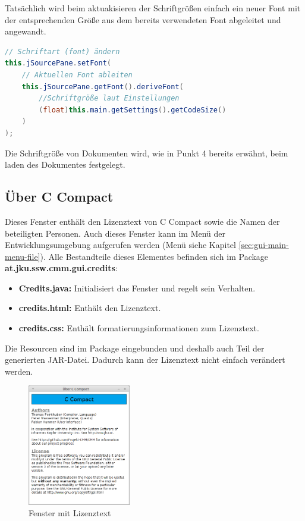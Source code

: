 Tatsächlich wird beim aktuakisieren der Schriftgrößen einfach ein neuer Font mit der entsprechenden Größe aus dem bereits verwendeten Font abgeleitet und angewandt.
\begin{lstlisting}[language=JAVA]
// Schriftart (font) ändern
this.jSourcePane.setFont(
	// Aktuellen Font ableiten
	this.jSourcePane.getFont().deriveFont(
		//Schriftgröße laut Einstellungen
		(float)this.main.getSettings().getCodeSize()
	)
);
\end{lstlisting}

Die Schriftgröße von Dokumenten wird, wie in Punkt 4 bereits erwähnt, beim laden des Dokumentes festgelegt.

\subsection{Über C Compact}
Dieses Fenster enthält den Lizenztext von C Compact sowie die Namen der beteiligten Personen. Auch dieses Fenster kann im Menü der Entwicklungsumgebung aufgerufen werden (Menü siehe Kapitel \ref{sec:gui-main-menu-file}). Alle Bestandteile dieses Elementes befinden sich im Package \textbf{at.jku.ssw.cmm.gui.credits}:
\begin{itemize}
\item \textbf{Credits.java:} Initialisiert das Fenster und regelt sein Verhalten.
\item \textbf{credits.html:} Enthält den Lizenztext.
\item \textbf{credits.css:} Enthält formatierungsinformationen zum Lizenztext.
\end{itemize}

Die Resourcen sind im Package eingebunden und deshalb auch Teil der generierten JAR-Datei. Dadurch kann der Lizenztext nicht einfach verändert werden.

\begin{figure}[htp]
\centering
\includegraphics[width=0.4\textwidth]{./media/images/gui/elements/Bildschirmfoto-About.png}
\caption{Fenster mit Lizenztext}
\label{fig:win-about}
\end{figure}

